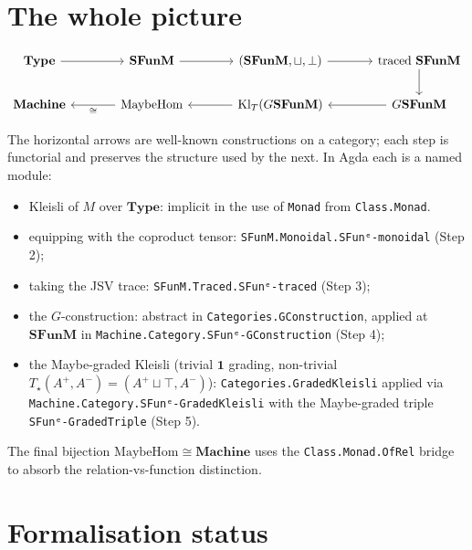 \documentclass[11pt]{article}
\newcommand{\SFunM}{\mathbf{SFunM}}
\newcommand{\Machine}{\mathbf{Machine}}
\begin{document}
\section{The whole picture}

\[
\begin{tikzcd}[column sep=large]
  \mathbf{Type} \arrow[r] &
  \SFunM \arrow[r] &
  (\SFunM, \sqcup, \bot) \arrow[r] &
  \text{traced } \SFunM \arrow[d] \\
  \Machine &
  \mathrm{MaybeHom} \arrow[l, "\cong"] &
  \mathrm{Kl}_T(G\SFunM) \arrow[l] &
  G\SFunM \arrow[l]
\end{tikzcd}
\]

\noindent
The horizontal arrows are well-known constructions on a category;
each step is functorial and preserves the structure used by the
next.  In Agda each is a named module:
\begin{itemize}
  \item Kleisli of $M$ over $\mathbf{Type}$: implicit in the use of
        \texttt{Monad} from \texttt{Class.Monad}.
  \item equipping with the coproduct tensor:
        \texttt{SFunM.Monoidal.SFunᵉ-monoidal} (Step 2);
  \item taking the JSV trace: \texttt{SFunM.Traced.SFunᵉ-traced}
        (Step 3);
  \item the $G$-construction: abstract in
        \texttt{Categories.GConstruction}, applied at $\SFunM$ in
        \texttt{Machine.Category.SFunᵉ-GConstruction} (Step 4);
  \item the Maybe-graded Kleisli (trivial $\mathbf{1}$ grading,
        non-trivial $T_\star(A^+, A^-) = (A^+ \sqcup \top, A^-)$):
        \texttt{Categories.GradedKleisli} applied via
        \texttt{Machine.Category.SFunᵉ-GradedKleisli} with the
        Maybe-graded triple \texttt{SFunᵉ-GradedTriple} (Step 5).
\end{itemize}
The final bijection $\mathrm{MaybeHom} \cong \Machine$ uses the
\texttt{Class.Monad.OfRel} bridge to absorb the
relation-vs-function distinction.

\section{Formalisation status}
\end{document}
